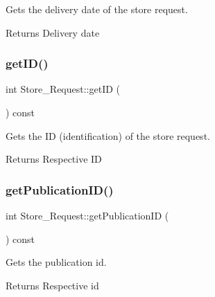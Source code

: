 Gets the delivery date of the store request. 

\begin{DoxyReturn}{Returns}
Delivery date 
\end{DoxyReturn}
\mbox{\label{class_store___request_aea346d2504acd89a30dd7aa79b633e0e}} 
\subsubsection{\texorpdfstring{get\+I\+D()}{getID()}}
{\footnotesize\ttfamily int Store\+\_\+\+Request\+::get\+ID (\begin{DoxyParamCaption}{ }\end{DoxyParamCaption}) const}



Gets the ID (identification) of the store request. 

\begin{DoxyReturn}{Returns}
Respective ID 
\end{DoxyReturn}
\mbox{\label{class_store___request_a50429baf56bd03b19c8d53d00e8af756}} 
\subsubsection{\texorpdfstring{get\+Publication\+I\+D()}{getPublicationID()}}
{\footnotesize\ttfamily int Store\+\_\+\+Request\+::get\+Publication\+ID (\begin{DoxyParamCaption}{ }\end{DoxyParamCaption}) const}



Gets the publication id. 

\begin{DoxyReturn}{Returns}
Respective id 
\end{DoxyReturn}
\mbox{\label{class_store___request_aad810d40b6c8cfd55276cd069c2309f8}} 
